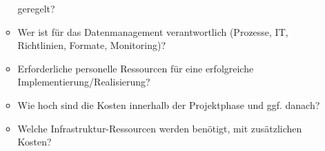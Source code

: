 \begin{enumerate}[start=0, label=\textbf{\arabic*})]
\begin{itemize}
                geregelt?
          \item Wer ist für das Datenmanagement verantwortlich (Prozesse, IT,
                Richtlinien, Formate, Monitoring)?
          \item Erforderliche personelle Ressourcen für eine erfolgreiche
                Implementierung/Realisierung?
          \item Wie hoch sind die Kosten innerhalb der Projektphase und ggf.
                danach?
          \item Welche Infrastruktur-Ressourcen werden benötigt, mit
                zusätzlichen Kosten?
        \end{itemize}
\end{enumerate}
